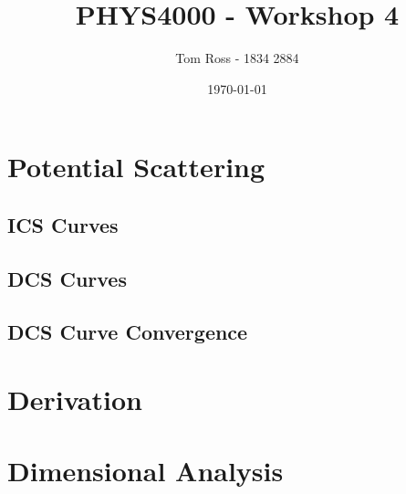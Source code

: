 \documentclass{article}
\title{PHYS4000 - Workshop 4}
\author{Tom Ross - 1834 2884}
\date{\today}
\begin{document}
\tableofcontents

\listoffigures

\listoftables

\clearpage

\section{Potential Scattering}
\label{sec:potential-scattering}

\subsection{ICS Curves}
\label{sec:ics-curves}

\begin{figure}[h]
  \begin{center}
    
  \end{center}
  \caption[Electron ICS Curves]{
  }
  \label{fig:ele-ics-curves}
\end{figure}

\begin{figure}[h]
  \begin{center}
    
  \end{center}
  \caption[Positron ICS Curves]{
  }
  \label{fig:pos-ics-curves}
\end{figure}

\subsection{DCS Curves}
\label{sec:dcs-curves}

\begin{figure}[h]
  \begin{center}
    
  \end{center}
  \caption[Electron DCS Curves]{
  }
  \label{fig:ele-dcs-curves}
\end{figure}

\begin{figure}[h]
  \begin{center}
    
  \end{center}
  \caption[Positron DCS Curves]{
  }
  \label{fig:pos-dcs-curves}
\end{figure}

\subsection{DCS Curve Convergence}
\label{sec:dcs-curve-conv}

\section{Derivation}
\label{sec:derivation}

\section{Dimensional Analysis}
\label{sec:dimensional-analysis}
\end{document}
